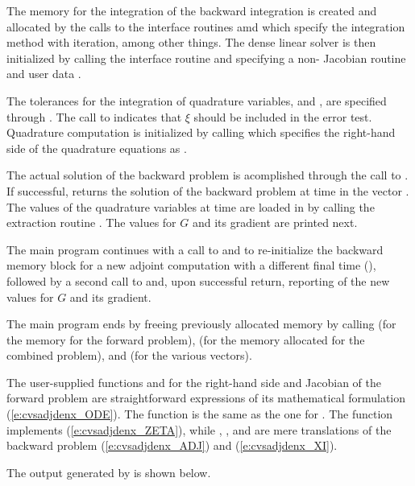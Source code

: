 The {\cvodes} memory for the integration of the backward integration is created and allocated
by the calls to the interface routines  amd  which 
specify the  integration method with  iteration, among other things.
The dense linear solver {\cvdense} is then initialized by calling the 
interface routine and specifying a non- Jacobian routine  and user data
.

The tolerances for the integration of quadrature variables,  and
, are specified through .
The call to  indicates that $\xi$ should be included
in the error test.
Quadrature computation is initialized by calling 
which specifies the right-hand side of the quadrature equations as .

The actual solution of the backward problem is acomplished through the call to
. If successful,  returns the solution of the backward 
problem at time  in the vector . The values of the quadrature
variables at time  are loaded in  by calling the extraction
routine . The values for $G$ and its gradient are printed next.

The main program continues with a call to  and
 to re-initialize the 
backward memory block for a new adjoint computation with a different final 
time (), followed by a second call to  and, upon successful
return, reporting of the new values for $G$ and its gradient.

The main program ends by freeing previously allocated memory by calling 
 (for the {\cvodes} memory for the forward problem),  
(for the memory allocated for the combined problem), and  
(for the various vectors).

The user-supplied functions  and  for the right-hand side and
Jacobian of the forward problem are straightforward expressions of its 
mathematical formulation (\ref{e:cvsadjdenx_ODE}). 
The function  is the same as the one for .
The function  implements
(\ref{e:cvsadjdenx_ZETA}), while , , and  are mere translations 
of the backward problem (\ref{e:cvsadjdenx_ADJ}) and (\ref{e:cvsadjdenx_XI}).

The output generated by  is shown below.

